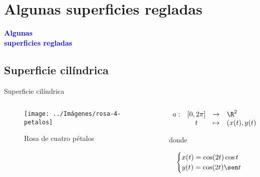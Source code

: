 \documentclass[10pt]{beamer}
\begin{document}
	\section{Algunas superficies regladas}
	
	\begin{frame}
		\begin{center}
			\Huge\textbf{\textsf{\textcolor{blue}{Algunas \\ superficies regladas}}}
		\end{center}
	\end{frame}
	
	\subsection{Superficie cilíndrica}
	
	\begin{frame}{Superficie cilíndrica}
		
		\begin{columns}[t] %
			\begin{column}{.60\textwidth}
				\begin{figure}
					\centering
					\texttt{[image: ../Imágenes/rosa-4-petalos]}
					\caption{Rosa de cuatro pétalos}
					\label{fig:rosa-4-petalos}
				\end{figure}
			\end{column}%
			\hfill%
			\begin{column}{.40\textwidth}
				$$\begin{array}{rcll}
					a : & [0, 2\pi] & \to & \R^2\\
						& t & \mapsto & (x(t), y(t))
				\end{array}$$
				
			donde 
			
			$$ \begin{cases}
			x(t) = \cos(2t)\cos t \\
			y(t) = \cos(2t) \sen t
			\end{cases} $$
			\end{column}%
		\end{columns}
	
	\end{frame}
	
\end{document}
